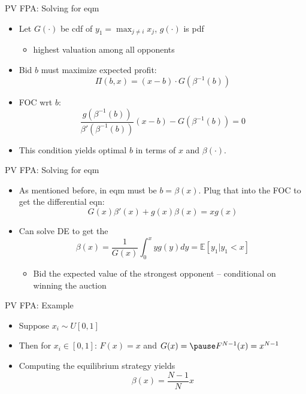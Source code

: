 \documentclass[english,10pt
,aspectratio=169
]{beamer}
\begin{document}
\begin{frame}{PV FPA: Solving for eqm}
	\begin{itemize}
		\item Let $G(\cdot)$ be cdf of $y_1 = \max_{j\neq i} x_j$, $g(\cdot)$ is pdf
		\begin{itemize}
			\item highest valuation among all opponents
		\end{itemize}
		\item Bid $b$ must maximize expected profit:
		\[ \Pi(b,x) = (x-b) \cdot G \left( \beta^{-1}(b) \right) \]
		\item FOC wrt $b$:
		\[ \frac{g\left( \beta^{-1}(b) \right)}{\beta' \left( \beta^{-1}(b) \right)} (x-b) - G\left( \beta^{-1}(b) \right) = 0 \]
		\item This condition yields optimal $b$ in terms of $x$ and $\beta(\cdot)$.
	\end{itemize}
\end{frame}


\begin{frame}{PV FPA: Solving for eqm}
	\begin{itemize}
		\item As mentioned before, in eqm must be $b = \beta(x)$. Plug that into the FOC to get the differential eqn:
		\[ G(x) \beta'(x) + g(x) \beta(x) = xg(x) \]
		\item Can solve DE to get the 
		\[ \beta(x) = \frac{1}{G(x)} \int_0^x yg(y) dy = \mathbb{E}[y_1 | y_1<x] \]
		\begin{itemize}
			\item Bid the expected value of the strongest opponent -- conditional on winning the auction
		\end{itemize}
	\end{itemize}
\end{frame}


\begin{frame}{PV FPA: Example}
	\begin{itemize}
		\item Suppose $x_i \sim U[0,1]$
		\item Then for $x_i\in [0,1]$: $F(x) = x$ and $G(x) = \pause F^{N-1}(x)= x^{N-1}$
		\item Computing the equilibrium strategy yields
		\[ \beta(x) = \frac{N-1}{N} x \]
	\end{itemize}
\end{frame}
\end{document}
